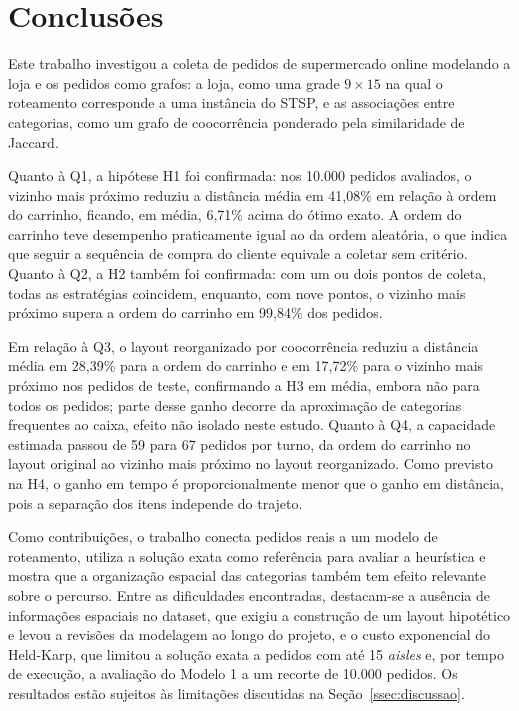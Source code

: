 \section{Conclusões}
\label{conclusoes}

Este trabalho investigou a coleta de pedidos de supermercado online modelando a loja e os pedidos como grafos: a loja, como uma grade $9 \times 15$ na qual o roteamento corresponde a uma instância do STSP, e as associações entre categorias, como um grafo de coocorrência ponderado pela similaridade de Jaccard.

Quanto à Q1, a hipótese H1 foi confirmada: nos 10.000 pedidos avaliados, o vizinho mais próximo reduziu a distância média em 41,08\% em relação à ordem do carrinho, ficando, em média, 6,71\% acima do ótimo exato. A ordem do carrinho teve desempenho praticamente igual ao da ordem aleatória, o que indica que seguir a sequência de compra do cliente equivale a coletar sem critério. Quanto à Q2, a H2 também foi confirmada: com um ou dois pontos de coleta, todas as estratégias coincidem, enquanto, com nove pontos, o vizinho mais próximo supera a ordem do carrinho em 99,84\% dos pedidos.

Em relação à Q3, o layout reorganizado por coocorrência reduziu a distância média em 28,39\% para a ordem do carrinho e em 17,72\% para o vizinho mais próximo nos pedidos de teste, confirmando a H3 em média, embora não para todos os pedidos; parte desse ganho decorre da aproximação de categorias frequentes ao caixa, efeito não isolado neste estudo. Quanto à Q4, a capacidade estimada passou de 59 para 67 pedidos por turno, da ordem do carrinho no layout original ao vizinho mais próximo no layout reorganizado. Como previsto na H4, o ganho em tempo é proporcionalmente menor que o ganho em distância, pois a separação dos itens independe do trajeto.

Como contribuições, o trabalho conecta pedidos reais a um modelo de roteamento, utiliza a solução exata como referência para avaliar a heurística e mostra que a organização espacial das categorias também tem efeito relevante sobre o percurso. Entre as dificuldades encontradas, destacam-se a ausência de informações espaciais no dataset, que exigiu a construção de um layout hipotético e levou a revisões da modelagem ao longo do projeto, e o custo exponencial do Held-Karp, que limitou a solução exata a pedidos com até 15 \textit{aisles} e, por tempo de execução, a avaliação do Modelo 1 a um recorte de 10.000 pedidos. Os resultados estão sujeitos às limitações discutidas na Seção~\ref{ssec:discussao}.

